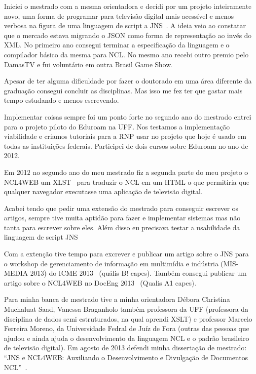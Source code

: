\documentclass[10pt,a4paper,oneside]{book}
\begin{document}
Iniciei o mestrado com a mesma orientadora e decidi por um projeto inteiramente novo, uma forma 
de programar para televisão digital mais acessível e menos verbosa na figura de uma linguagem de 
script a JNS~\cite{silva2013jnsieee}. A ideia veio ao constatar que o mercado estava migrando o JSON como forma de
representação ao invés do XML.
No primeiro ano consegui terminar a especificação da linguagem e o compilador básico da mesma para NCL.
No mesmo ano recebi outro premio pelo DamasTV e fui voluntário em outra Brasil Game Show.

Apesar de ter alguma dificuldade por fazer o doutorado em uma área diferente da graduação consegui concluir as
disciplinas. Mas isso me fez ter que gastar mais tempo estudando e menos escrevendo.

Implementar coisas sempre foi um ponto forte no segundo ano do mestrado entrei para o projeto piloto do Eduroam na
UFF. Nos testamos a implementação viabilidade e criamos tutoriais para a RNP usar no projeto que hoje é usado em todas
as instituições federais. Participei de dois cursos sobre Eduroam no ano de 2012.

Em 2012 no segundo ano do meu mestrado fiz a segunda parte do meu projeto o NCL4WEB um XLST~\cite{clark1999xsl} para
traduzir o NCL em um HTML o que permitiria que qualquer navegador executasse uma aplicação de televisão digital.

Acabei tendo que pedir uma extensão do mestrado para conseguir escrever os artigos, sempre tive muita aptidão para fazer
e implementar sistemas mas não tanta para escrever sobre eles. Além disso eu precisava testar a usabilidade da linguagem
de script JNS

Com a extenção tive tempo para excrever e publicar um artigo sobre o JNS para o workshop de gerenciamento  de informação
em multimídia e indústria (MIS-MEDIA 2013) do ICME 2013~\cite{silva2013jnsieee} (quális B! capes).
Também consegui publicar um artigo sobre o NCL4WEB no DocEng 2013~\cite{silva2013ncl4web} (Qualis A1 capes).

Para minha banca de mestrado tive a minha orientadora Débora Christina Muchaluat Saad, Vanessa 
Braganholo também professora da UFF (professora da disciplina de dados semi estruturados, na qual aprendi XSLT)
e professor Marcelo Ferreira Moreno, da Universidade Fedral de Juíz de Fora (outras das pessoas que ajudou e ainda ajuda
o desenvolvimento da linguagem NCL e o padrão brasileiro de televisão digital). Em agosto de 2013 defendi minha dissertação
de mestrado: “JNS e NCL4WEB: Auxiliando o Desenvolvimento e Divulgação de Documentos NCL”~\cite{silva2013jns}.
\end{document}

